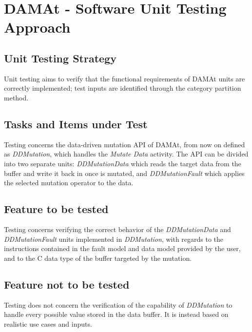 
\chapter{DAMAt - Software Unit Testing Approach}
\label{chap:approach_DAMAt}


\section{Unit Testing Strategy}

Unit testing aims to verify that the functional requirements of DAMAt units are correctly implemented; test inputs are identified through the category partition method.


\section{Tasks and Items under Test}

Testing concerns the data-driven mutation API of DAMAt, from now on defined as \emph{DDMutation}, which handles the \emph{Mutate Data} activity.
The API can be divided into two separate units: \emph{DDMutationData} which reads the target data from the buffer and write it back in once is mutated, and \emph{DDMutationFault} which applies the selected mutation operator to the data.

\section{Feature to be tested}

Testing concerns verifying the correct behavior of the \emph{DDMutationData} and \emph{DDMutationFault} units implemented in \emph{DDMutation}, with regards to the instructions contained in the fault model and data model provided by the user, and to the C data type of the buffer targeted by the mutation.

\section{Feature not to be tested}


Testing does not concern the verification of the capability of \emph{DDMutation} to handle every possible value stored in the data buffer. It is instead based on realistic use cases and inputs.

